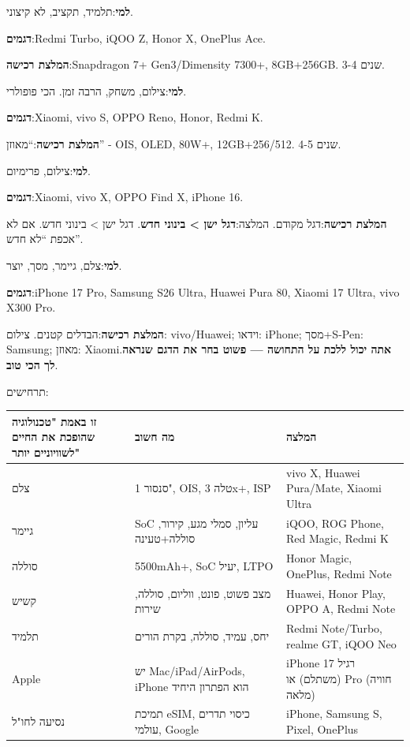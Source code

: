
\textbf{למי}:תלמיד, תקציב, לא קיצוני.

\textbf{דגמים}:Redmi Turbo, iQOO Z, Honor X, OnePlus Ace.

\textbf{המלצת רכישה}:Snapdragon 7+ Gen3/Dimensity 7300+, 8GB+256GB. 3-4 שנים.


\textbf{למי}:צילום, משחק, הרבה זמן. הכי פופולרי.

\textbf{דגמים}:Xiaomi, vivo S, OPPO Reno, Honor, Redmi K.

\textbf{המלצת רכישה}:“מאוזן” - OIS, OLED, 80W+, 12GB+256/512. 4-5 שנים.


\textbf{למי}:צילום, פרימיום.

\textbf{דגמים}:Xiaomi, vivo X, OPPO Find X, iPhone 16.

\textbf{המלצת רכישה}:דגל מקודם. המלצה:\textbf{דגל ישן > בינוני חדש}. דגל ישן > בינוני חדש. אם לא אכפת “לא חדש”.


\textbf{למי}:צלם, גיימר, מסך, יוצר.

\textbf{דגמים}:iPhone 17 Pro, Samsung S26 Ultra, Huawei Pura 80, Xiaomi 17 Ultra, vivo X300 Pro.

\textbf{המלצת רכישה}:הבדלים קטנים. צילום: vivo/Huawei; וידאו: iPhone; מסך+S-Pen: Samsung; מאוזן: Xiaomi.\textbf{אתה יכול ללכת על התחושה — פשוט בחר את הדגם שנראה לך הכי טוב}.


תרחישים:

\begin{center}
\begin{tabularx}{\linewidth}{|X|X|X|}
\hline
\textbf{זו באמת "טכנולוגיה שהופכת את החיים לשוויוניים יותר"} & \textbf{מה חשוב} & \textbf{המלצה} \tabularnewline
\hline
צלם & סנסור 1", OIS, טלה 3x+, ISP & vivo X, Huawei Pura/Mate, Xiaomi Ultra \tabularnewline
גיימר & SoC עליון, סמלי מגע, קירור, סוללה+טעינה & iQOO, ROG Phone, Red Magic, Redmi K \tabularnewline
סוללה & 5500mAh+, SoC יעיל, LTPO & Honor Magic, OnePlus, Redmi Note \tabularnewline
קשיש & מצב פשוט, פונט, ווליום, סוללה, שירות & Huawei, Honor Play, OPPO A, Redmi Note \tabularnewline
תלמיד & יחס, עמיד, סוללה, בקרת הורים & Redmi Note/Turbo, realme GT, iQOO Neo \tabularnewline
Apple & יש Mac/iPad/AirPods, iPhone הוא הפתרון היחיד & iPhone 17 רגיל (משתלם) או Pro (חוויה מלאה) \tabularnewline
נסיעה לחו"ל & תמיכת eSIM, כיסוי תדרים עולמי, Google & iPhone, Samsung S, Pixel, OnePlus \tabularnewline
\hline
\end{tabularx}
\end{center}

